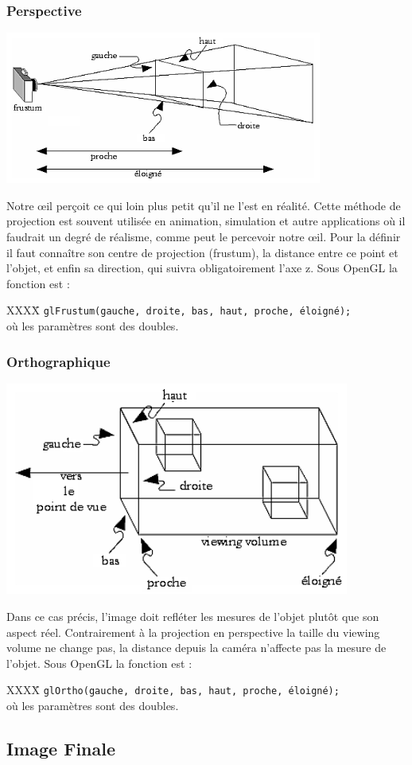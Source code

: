 \subsubsection{Perspective}
\begin{center}
	 \includegraphics[height=5cm]{img/Perspective}
 \end{center}
Notre œil perçoit ce qui loin plus petit qu’il ne l’est en réalité. Cette méthode de projection est souvent utilisée en animation, simulation et autre applications où il faudrait un degré de réalisme, comme peut le percevoir notre œil. Pour la définir il faut connaître son centre de projection (frustum), la distance entre ce point et l'objet, et enfin sa direction, qui suivra obligatoirement l’axe z. Sous OpenGL la fonction est : 
\begin{tabbing}
XXXX\= \kill
\> \verb|glFrustum(gauche, droite, bas, haut, proche, éloigné);| \\où les paramètres sont des doubles.
\end{tabbing}


\subsubsection{Orthographique}
\begin{center}
	 \includegraphics[height=7cm]{img/Ortho}
 \end{center}
Dans ce cas précis, l’image doit refléter les mesures de l’objet plutôt que son aspect réel. Contrairement à la projection en perspective la taille du viewing volume ne change pas, la distance depuis la caméra n’affecte pas la mesure de l’objet. Sous OpenGL la fonction est : 
\begin{tabbing}
XXXX\= \kill
\> \verb|glOrtho(gauche, droite, bas, haut, proche, éloigné);| \\où les paramètres sont des doubles.
\end{tabbing}

\subsection{Image Finale}


\newpage